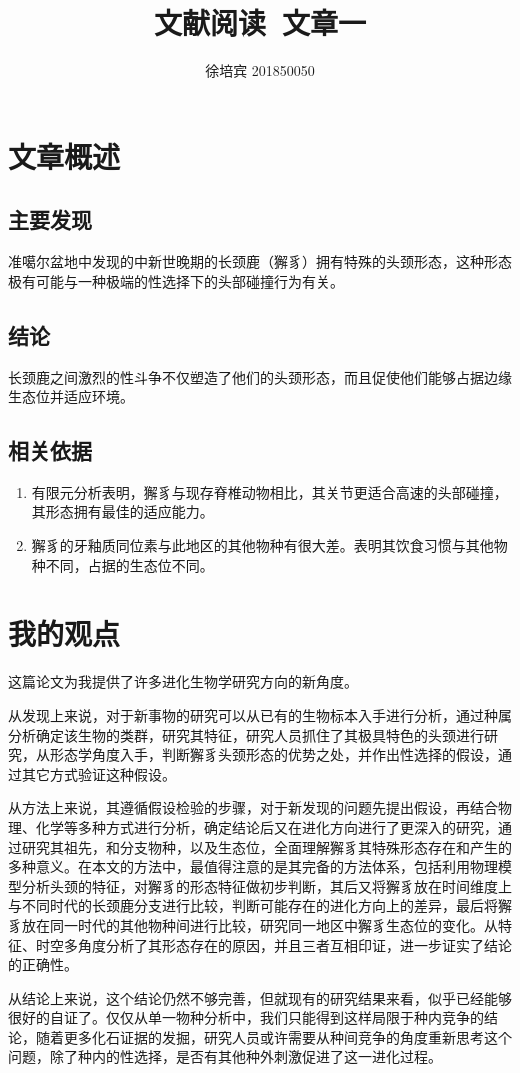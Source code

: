 \documentclass[UTF8]{article}
\title{文献阅读\ 文章一}
\author{徐培宾 201850050}
\begin{document}
    \maketitle
    \section{文章概述}
    \subsection{主要发现}
    准噶尔盆地中发现的中新世晚期的长颈鹿（獬豸）拥有特殊的头颈形态，这种形态极有可能与一种极端的性选择下的头部碰撞行为有关。

    \subsection{结论}
    长颈鹿之间激烈的性斗争不仅塑造了他们的头颈形态，而且促使他们能够占据边缘生态位并适应环境。

    \subsection{相关依据}
    \begin{enumerate}
        \item 有限元分析表明，獬豸与现存脊椎动物相比，其关节更适合高速的头部碰撞，其形态拥有最佳的适应能力。
        \item 獬豸的牙釉质同位素与此地区的其他物种有很大差。表明其饮食习惯与其他物种不同，占据的生态位不同。
    \end{enumerate}

    \section{我的观点}
    这篇论文为我提供了许多进化生物学研究方向的新角度。

    从发现上来说，对于新事物的研究可以从已有的生物标本入手进行分析，通过种属分析确定该生物的类群，研究其特征，研究人员抓住了其极具特色的头颈进行研究，从形态学角度入手，判断獬豸头颈形态的优势之处，并作出性选择的假设，通过其它方式验证这种假设。
    
    从方法上来说，其遵循假设检验的步骤，对于新发现的问题先提出假设，再结合物理、化学等多种方式进行分析，确定结论后又在进化方向进行了更深入的研究，通过研究其祖先，和分支物种，以及生态位，全面理解獬豸其特殊形态存在和产生的多种意义。在本文的方法中，最值得注意的是其完备的方法体系，包括利用物理模型分析头颈的特征，对獬豸的形态特征做初步判断，其后又将獬豸放在时间维度上与不同时代的长颈鹿分支进行比较，判断可能存在的进化方向上的差异，最后将獬豸放在同一时代的其他物种间进行比较，研究同一地区中獬豸生态位的变化。从特征、时空多角度分析了其形态存在的原因，并且三者互相印证，进一步证实了结论的正确性。
    
    从结论上来说，这个结论仍然不够完善，但就现有的研究结果来看，似乎已经能够很好的自证了。仅仅从单一物种分析中，我们只能得到这样局限于种内竞争的结论，随着更多化石证据的发掘，研究人员或许需要从种间竞争的角度重新思考这个问题，除了种内的性选择，是否有其他种外刺激促进了这一进化过程。
\end{document}
